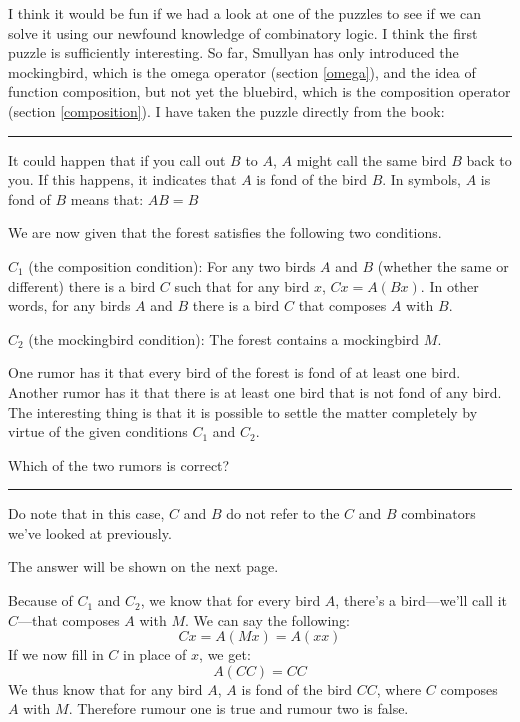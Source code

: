 \documentclass[11pt]{article}
\begin{document}
I think it would be fun if we had a look at one of the puzzles to see if we can
solve it using our newfound knowledge of combinatory logic. I think the first
puzzle is sufficiently interesting. So far, Smullyan has only introduced the
mockingbird, which is the omega operator (section \ref{omega}), and the idea of
function composition, but not yet the bluebird, which is the composition
operator (section \ref{composition}). I have taken the puzzle directly from the
book:

\setlength{\leftskip}{1cm}
\setlength{\rightskip}{1cm}
\begin{center}
\rule{15cm}{0.5pt}
\end{center}

It could happen that if you call out \(B\) to \(A\), \(A\) might call the same
bird \(B\) back to you. If this happens, it indicates that \(A\) is fond of the
bird \(B\). In symbols, \(A\) is fond of \(B\) means that: \(AB = B\)

We are now given that the forest satisfies the following two conditions. 

\(C_{1}\) (the composition condition): For any two birds \(A\) and \(B\)
(whether the same or different) there is a bird \(C\) such that for any bird
\(x\), \(Cx = A(Bx)\). In other words, for any birds \(A\) and \(B\) there is a
bird \(C\) that composes \(A\) with \(B\). 

\(C_{2}\) (the mockingbird condition): The forest contains a mockingbird \(M\). 

One rumor has it that every bird of the forest is fond of at least one bird.
Another rumor has it that there is at least one bird that is not fond of any
bird. The interesting thing is that it is possible to settle the matter
completely by virtue of the given conditions \(C_{1}\) and \(C_{2}\).

Which of the two rumors is correct? 

\begin{center}
\rule{15cm}{0.5pt}
\end{center}
\setlength{\leftskip}{0pt}
\setlength{\rightskip}{0pt}

Do note that in this case, \(C\) and \(B\) do not refer to the \(C\) and \(B\)
combinators we've looked at previously.

The answer will be shown on the next page.

\newpage

Because of \(C_{1}\) and \(C_{2}\), we know that for every bird \(A\), there's
a bird---we'll call it \(C\)---that composes \(A\) with \(M\). We can say the
following:
\[Cx=A(Mx)=A(xx)\] 
If we now fill in \(C\) in place of \(x\), we get:
\[A(CC)=CC\]
We thus know that for any bird \(A\), \(A\) is fond of the bird \(CC\), where
\(C\) composes \(A\) with \(M\). Therefore rumour one is true and rumour two is
false.
\end{document}
